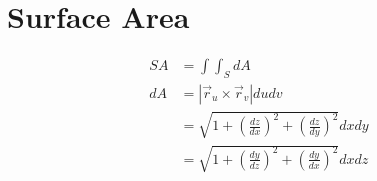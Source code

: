 \section{Surface Area}

  \begin{align}
    SA
      &= \int \int_{S} dA \\
    dA
      &= \left| \vec{r}_{u} \times \vec{r}_{v} \right| du dv \\
      &= \sqrt{1 + \left( \frac{dz}{dx} \right)^{2} + \left( \frac{dz}{dy} \right)^{2}} dx dy \\
      &= \sqrt{1 + \left( \frac{dy}{dz} \right)^{2} + \left( \frac{dy}{dx} \right)^{2}} dx dz
  \end{align}